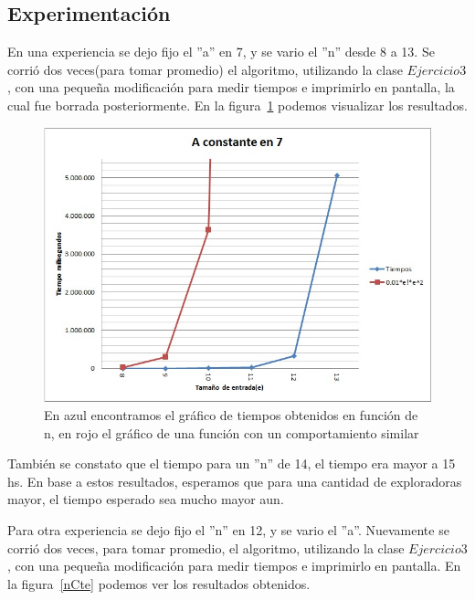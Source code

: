 \newpage
\subsection{Experimentación}

En una experiencia se dejo fijo el ''a'' en 7, y se vario el ''n'' desde 8 a 13. Se corrió dos veces(para tomar promedio) el algoritmo, utilizando la clase $Ejercicio3$, con una pequeña modificación para medir tiempos e imprimirlo en pantalla, la cual fue borrada posteriormente. En la figura~\ref{aCte} podemos visualizar los resultados.

\begin{figure}[H]
  \begin{center}
      \includegraphics[scale=0.75]{imagenes/GraficoEj3Aacotado7.jpg}
  \end{center}
  \caption{En azul encontramos el gráfico de tiempos obtenidos en función de n, en rojo el gráfico de una función con un comportamiento similar}
  \label{aCte}
\end{figure}

También se constato que el tiempo para un ''n'' de 14, el tiempo era mayor a 15 hs. En base a estos resultados, esperamos que para una cantidad de exploradoras mayor, el tiempo esperado sea mucho mayor aun.

Para otra experiencia se dejo fijo el ''n'' en 12, y se vario el ''a''. Nuevamente se corrió dos veces, para tomar promedio, el algoritmo, utilizando la clase $Ejercicio3$, con una pequeña modificación para medir tiempos e imprimirlo en pantalla. En la figura~\ref{nCte} podemos ver los resultados obtenidos.

